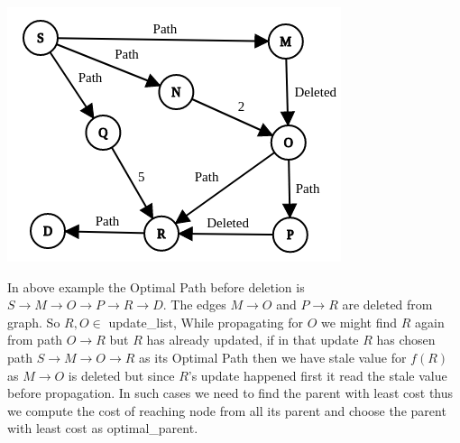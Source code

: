 \documentclass[a4paper]{article}
\begin{document}
\begin{center}
\includegraphics[scale=0.45]{img/Delete1.png}    
\end{center}
In above example the Optimal Path before deletion is $S \rightarrow M \rightarrow O \rightarrow P \rightarrow R \rightarrow D $.
The edges $ M \rightarrow O$ and $P \rightarrow R$ are deleted from graph. So $R,O \in $ update\_list, While propagating for $O$ we might find $R$ again from path $O \rightarrow R$ but $R$ has already updated, if in that update $R$ has chosen path $S \rightarrow M \rightarrow O \rightarrow R$ as its Optimal Path then we have stale value for $f(R)$ as $M \rightarrow O$ is deleted but since $R$'s update happened first it read the stale value before propagation. In such cases we need to find the parent with least cost thus we compute the cost of reaching node from all its parent and choose the parent with least cost as optimal\_parent.
\end{document}
